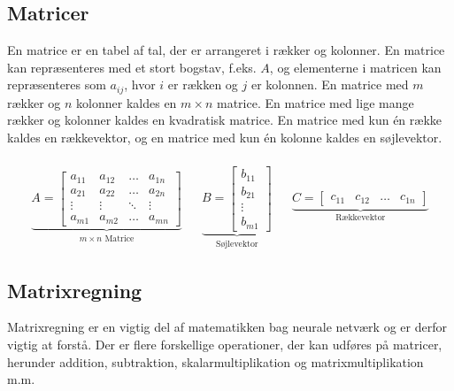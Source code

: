 \documentclass{article}
\begin{document}
\subsection{Matricer}
En matrice er en tabel af tal, der er arrangeret i rækker og kolonner. En matrice kan repræsenteres med et stort bogstav, f.eks. $A$, og elementerne i matricen kan repræsenteres som $a_{ij}$, hvor $i$ er rækken og $j$ er kolonnen. En matrice med $m$ rækker og $n$ kolonner kaldes en $m \times n$ matrice. En matrice med lige mange rækker og kolonner kaldes en kvadratisk matrice. En matrice med kun én række kaldes en rækkevektor, og en matrice med kun én kolonne kaldes en søjlevektor. \parencite{Lauritzen_2019}\\\\
\begin{align}
  \underbrace{A = \begin{bmatrix}
    a_{11} & a_{12} & \ldots & a_{1n} \\
    a_{21} & a_{22} & \ldots & a_{2n} \\
    \vdots & \vdots & \ddots & \vdots \\
    a_{m1} & a_{m2} & \ldots & a_{mn}
  \end{bmatrix}}_{\text{$m \times n$ Matrice}} 
  &&
  \underbrace{B = \begin{bmatrix}
    b_{11} \\
    b_{21} \\
    \vdots \\
    b_{m1}
  \end{bmatrix}}_{\text{Søjlevektor}} 
  &&
  \underbrace{C = \begin{bmatrix}
    c_{11} & c_{12} & \ldots & c_{1n}
  \end{bmatrix}}_{\text{Rækkevektor}} 
\end{align}
\subsection{Matrixregning}
Matrixregning er en vigtig del af matematikken bag neurale netværk og er derfor vigtig at forstå. Der er flere forskellige operationer, der kan udføres på matricer, herunder addition, subtraktion, skalarmultiplikation og matrixmultiplikation m.m.
\end{document}
